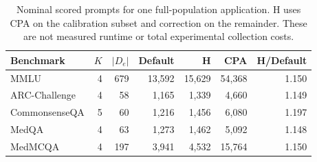 \begin{table}[htbp]
\centering\small\setlength{\tabcolsep}{4pt}
\caption{Nominal scored prompts for one full-population application. H uses CPA on the calibration subset and correction on the remainder. These are not measured runtime or total experimental collection costs.}
\label{tab:workload}
\begin{tabular}{lrrrrrr}
\toprule
Benchmark & $K$ & $|D_e|$ & Default & H & CPA & H/Default\\
\midrule
MMLU & 4 & 679 & 13,592 & 15,629 & 54,368 & 1.150\\
ARC-Challenge & 4 & 58 & 1,165 & 1,339 & 4,660 & 1.149\\
CommonsenseQA & 5 & 60 & 1,216 & 1,456 & 6,080 & 1.197\\
MedQA & 4 & 63 & 1,273 & 1,462 & 5,092 & 1.148\\
MedMCQA & 4 & 197 & 3,941 & 4,532 & 15,764 & 1.150\\
\bottomrule
\end{tabular}
\end{table}
